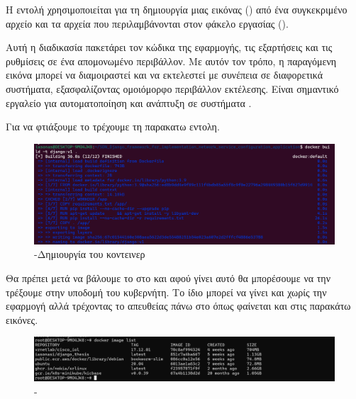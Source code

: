 \FloatBarrier


Η εντολή  χρησιμοποιείται για τη δημιουργία μιας εικόνας  () 
από ένα συγκεκριμένο αρχείο  και τα αρχεία που περιλαμβάνονται στον φάκελο εργασίας ().

Αυτή η διαδικασία πακετάρει τον κώδικα της εφαρμογής, τις εξαρτήσεις και τις ρυθμίσεις σε ένα απομονωμένο περιβάλλον. 
Με αυτόν τον τρόπο, η παραγόμενη εικόνα μπορεί να διαμοιραστεί και να εκτελεστεί με συνέπεια σε διαφορετικά συστήματα, 
εξασφαλίζοντας ομοιόμορφο περιβάλλον εκτέλεσης. Είναι σημαντικό εργαλείο για αυτοματοποίηση και ανάπτυξη σε συστήματα .

Για να φτιάξουμε το  τρέχουμε τη παρακατω εντολη. 

\FloatBarrier

\begin{figure}[h]
	\centering
	\includegraphics[width=1.0\textwidth]{graphics/docker_build.png}
	\caption{-Δημιουργία του κοντεινερ}
\end{figure}

\FloatBarrier

Θα πρέπει μετά να βάλουμε το  στο  και αφού γίνει αυτό θα μπορέσουμε να την τρέξουμε στην υποδομή του κυβερνήτη.
Το ίδιο μπορεί να γίνει και χωρίς την εφαρμογή  αλλά τρέχοντας το 
απευθείας πάνω στο  όπως φαίνεται και στις παρακάτω εικόνες.

\FloatBarrier


\begin{figure}[h]
	\centering
	\includegraphics[width=1.5\textwidth]{graphics/docker_image_list_2.png}
	\caption{-}
\end{figure}

